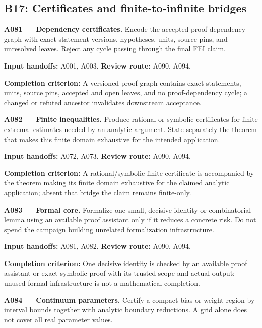 \documentclass[11pt]{article}
\begin{document}
\subsection{B17: Certificates and finite-to-infinite bridges}

\textbf{A081 --- Dependency certificates.} Encode the accepted proof dependency graph with exact statement versions, hypotheses, units, source pins, and unresolved leaves. Reject any cycle passing through the final FEI claim.

{\small\color{ink}\textbf{Input handoffs:} A001, A003. \textbf{Review route:} A090, A094.\par
\textbf{Completion criterion:} A versioned proof graph contains exact statements, units, source pins, accepted and open leaves, and no proof-dependency cycle; a changed or refuted ancestor invalidates downstream acceptance.\par}



\textbf{A082 --- Finite inequalities.} Produce rational or symbolic certificates for finite extremal estimates needed by an analytic argument. State separately the theorem that makes this finite domain exhaustive for the intended application.

{\small\color{ink}\textbf{Input handoffs:} A072, A073. \textbf{Review route:} A090, A094.\par
\textbf{Completion criterion:} A rational/symbolic finite certificate is accompanied by the theorem making its finite domain exhaustive for the claimed analytic application; absent that bridge the claim remains finite-only.\par}



\textbf{A083 --- Formal core.} Formalize one small, decisive identity or combinatorial lemma using an available proof assistant only if it reduces a concrete risk. Do not spend the campaign building unrelated formalization infrastructure.

{\small\color{ink}\textbf{Input handoffs:} A081, A082. \textbf{Review route:} A090, A094.\par
\textbf{Completion criterion:} One decisive identity is checked by an available proof assistant or exact symbolic proof with its trusted scope and actual output; unused formal infrastructure is not a mathematical completion.\par}



\textbf{A084 --- Continuum parameters.} Certify a compact bias or weight region by interval bounds together with analytic boundary reductions. A grid alone does not cover all real parameter values.
\end{document}
